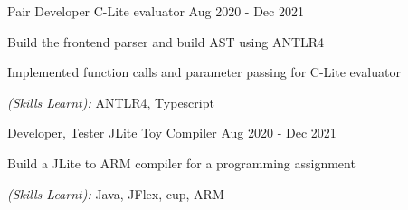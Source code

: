 

\begin{cventries}



  \cventry
    {Pair Developer} %
    {C-Lite evaluator} %
    {} %
    {Aug 2020 - Dec 2021} %
    {
      \begin{cvitems} %
        \item {Build the frontend parser and build AST using ANTLR4}
        \item {Implemented function calls and parameter passing for C-Lite evaluator}
        \item {\textit{(Skills Learnt):} ANTLR4, Typescript}
      \end{cvitems}
    }


  \cventry
    {Developer, Tester} %
    {JLite Toy Compiler} %
    {} %
    {Aug 2020 - Dec 2021} %
    {
      \begin{cvitems} %
        \item {Build a JLite to ARM compiler for a programming assignment}
        \item {\textit{(Skills Learnt):} Java, JFlex, cup, ARM}
      \end{cvitems}
    }


\end{cventries}
